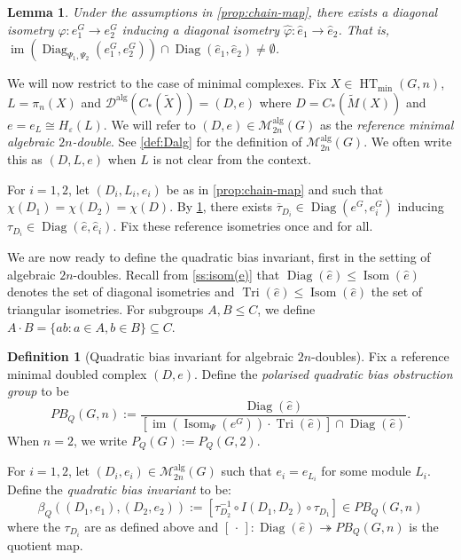 \documentclass[11pt,a4paper,leqno]{amsart}
\newtheorem{lemma}[theorem]{Lemma}
\theoremstyle{definition}
\newtheorem{definition}[theorem]{Definition}
\theoremstyle{remark}
\newcommand{\wh}{\widehat}
\newcommand{\wt}{\widetilde}
\newcommand{\ol}{\overline}
\DeclareMathOperator{\IM}{im}
\DeclareMathOperator{\Isom}{Isom}
\DeclareMathOperator{\DiagIsom}{Diag}
\DeclareMathOperator{\HT}{HT}
\DeclareMathOperator{\alg}{alg}
\DeclareMathOperator{\TriIsom}{Tri}
\newcommand{\Malg}{\mathscr{M}^{\alg}}
\newcommand{\ep}{\varepsilon}
\begin{document}
\begin{lemma} \label{lemma:diag-inducing-diag} Under the assumptions in \cref{prop:chain-map}, 
there exists a diagonal isometry $\varphi\colon e_1^G \to e_2^G$ inducing a diagonal isometry $\wh \varphi\colon \wh e_1 \to \wh e_2$. That is, $\IM(\DiagIsom_{\Psi_1,\Psi_2}(e_1^G,e_2^G)) \cap \DiagIsom(\wh e_1, \wh e_2) \ne \emptyset$.
\end{lemma}

We will now restrict to the case of minimal complexes.
Fix $X \in \HT_{\min}(G,n)$, $L = \pi_n(X)$ and $\mathscr{D}^{\alg}(C_*(\wt X)) = (D,e)$ where $D = C_*(\wt M(X))$ and $e = e_L \cong H_\ep(L)$. We will refer to $(D,e) \in \Malg_{2n}(G)$ as the \textit{reference minimal algebraic $2n$-double}. See \cref{def:Dalg} for the definition of $\Malg_{2n}(G)$. 
We  often write this as $(D,L,e)$ when $L$ is not clear from the context.

For $i = 1,2$, let $(D_i,L_i,e_i)$ be as in \cref{prop:chain-map} and such that $\chi(D_1) = \chi(D_2) = \chi(D)$. By \cref{lemma:diag-inducing-diag}, there exists $\ol{\tau}_{D_i} \in \DiagIsom(e^G,e_i^G)$ inducing $\tau_{D_i} \in \DiagIsom(\wh e, \wh e_i)$.
Fix these reference isometries once and for all.

We are now ready to define the quadratic bias invariant, first in the setting of algebraic $2n$-doubles.
Recall from \cref{ss:isom(e)} that $\DiagIsom(\wh e)\le \Isom(\wh e)$ denotes the set of diagonal isometries and  $\TriIsom(\wh e) \le \Isom(\wh e)$ the set of triangular isometries. For subgroups $A, B \le C$, we define $A \cdot B = \{ab : a\in A, b \in B\} \subseteq C$.
 
\begin{definition}[Quadratic bias invariant for algebraic $2n$-doubles] \label{def:bias-quad}
Fix a reference minimal doubled complex $(D,e)$. 
Define the \textit{polarised quadratic bias obstruction group} to be
\[ PB_Q(G,n):= \frac{\DiagIsom(\wh e)}{[\IM(\Isom_\Psi(e^G)) \cdot \TriIsom(\wh e)] \cap \DiagIsom(\wh e)}. \]	
When $n = 2$, we write $P_Q(G):=P_Q(G,2)$.

For $i=1,2$, let $(D_i,e_i) \in \Malg_{2n}(G)$ such that $e_i = e_{L_i}$ for some module $L_i$.
Define the \textit{quadratic bias invariant} to be:
\[ \beta_{Q}((D_1,e_1),(D_2,e_2)) := [\tau_{D_2}^{-1} \circ I(D_1,D_2) \circ \tau_{D_1}] \in PB_Q(G,n) \]
where the $\tau_{D_i}$ are as defined above and $[\,\cdot\,]\colon  \DiagIsom(\wh e) \twoheadrightarrow PB_Q(G,n)$ is the quotient map.
\end{definition}
\end{document}
